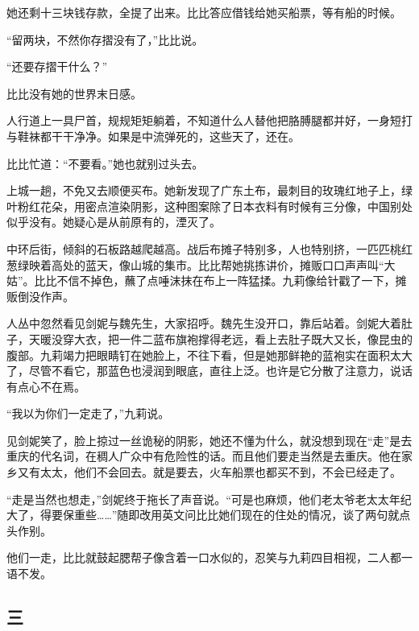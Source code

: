 \par 她还剩十三块钱存款，全提了出来。比比答应借钱给她买船票，等有船的时候。
\par “留两块，不然你存摺没有了，”比比说。
\par “还要存摺干什么？”
\par 比比没有她的世界末日感。
\par 人行道上一具尸首，规规矩矩躺着，不知道什么人替他把胳膊腿都并好，一身短打与鞋袜都干干净净。如果是中流弹死的，这些天了，还在。
\par 比比忙道：“不要看。”她也就别过头去。
\par 上城一趟，不免又去顺便买布。她新发现了广东土布，最刺目的玫瑰红地子上，绿叶粉红花朵，用密点渲染阴影，这种图案除了日本衣料有时候有三分像，中国别处似乎没有。她疑心是从前原有的，湮灭了。
\par 中环后街，倾斜的石板路越爬越高。战后布摊子特别多，人也特别挤，一匹匹桃红葱绿映着高处的蓝天，像山城的集市。比比帮她挑拣讲价，摊贩口口声声叫“大姑”。比比不信不掉色，蘸了点唾沫抹在布上一阵猛揉。九莉像给针戳了一下，摊贩倒没作声。
\par 人丛中忽然看见剑妮与魏先生，大家招呼。魏先生没开口，靠后站着。剑妮大着肚子，天暖没穿大衣，把一件二蓝布旗袍撑得老远，看上去肚子既大又长，像昆虫的腹部。九莉竭力把眼睛钉在她脸上，不往下看，但是她那鲜艳的蓝袍实在面积太大了，尽管不看它，那蓝色也浸润到眼底，直往上泛。也许是它分散了注意力，说话有点心不在焉。
\par “我以为你们一定走了，”九莉说。
\par 见剑妮笑了，脸上掠过一丝诡秘的阴影，她还不懂为什么，就没想到现在“走”是去重庆的代名词，在稠人广众中有危险性的话。而且他们要走当然是去重庆。他在家乡又有太太，他们不会回去。就是要去，火车船票也都买不到，不会已经走了。
\par “走是当然也想走，”剑妮终于拖长了声音说。“可是也麻烦，他们老太爷老太太年纪大了，得要保重些……”随即改用英文问比比她们现在的住处的情况，谈了两句就点头作别。
\par 他们一走，比比就鼓起腮帮子像含着一口水似的，忍笑与九莉四目相视，二人都一语不发。



\subsection{三}

